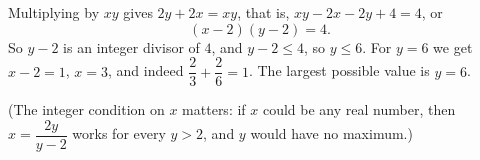 Multiplying by $xy$ gives $2y+2x=xy$, that is, $xy-2x-2y+4=4$, or
\[(x-2)(y-2)=4 .\]
So $y-2$ is an integer divisor of $4$, and $y-2\le4$, so $y\le6$. For $y=6$ we get $x-2=1$, $x=3$, and indeed $\dfrac{2}{3}+\dfrac{2}{6}=1$. The largest possible value is $y=\boxed{6}$.

(The integer condition on $x$ matters: if $x$ could be any real number, then $x=\dfrac{2y}{y-2}$ works for every $y>2$, and $y$ would have no maximum.)
